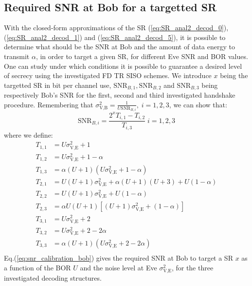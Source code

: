 \documentclass[journal,comsoc]{IEEEtran}
\begin{document}
\subsection{Required SNR at Bob for a targetted SR}
 \label{sec:required-snr-at-bob-for-a-targetted-sr}
With the closed-form approximations of the SR (\ref{eq:SR_anal2_decod_0}), (\ref{eq:SR_anal2_decod_1}) and (\ref{eq:SR_anal2_decod_5}), it is possible to determine what should be the SNR at Bob and the amount of data energy to transmit $\alpha$, in order to target a given SR, for different Eve SNR and BOR values. One can study under which conditions it is possible to guarantee a desired level of secrecy using the investigated FD TR SISO schemes. We introduce $x$ being the targetted SR in bit per channel use, $\text{SNR}_{B,1},\text{SNR}_{B,2}$ and $\text{SNR}_{B,3}$ being respectively Bob's SNR for the first, second and third investigated handshake procedure. Remembering that $\sigma^2_{\text{V,B}} = \frac{1}{U\text{SNR}_{B,i}} , \;  i = 1,2,3$, we can show that:
\begin{equation}
	\text{SNR}_{B,i} = \frac{2^x T_{i,1} - T_{i,2} }{T_{i,3}} \; i = 1,2,3
	\label{eq:snr_calibration_bob}
\end{equation}
where we define: 
\begin{equation}
\begin{split}
	T_{1,1} &=  U\sigma_{\text{V,E}}^2+1\\
	T_{1,2} &=  U\sigma_{\text{V,E}}^2+1-\alpha\\
	T_{1,3} &=  \alpha(U+1)(U\sigma_{\text{V,E}}^2+1-\alpha) \\
	T_{2,1} &=  U(U+1)\sigma_{\text{V,E}}^2 + \alpha(U+1)(U+3)+U(1-\alpha)\\
	T_{2,2} &=   U(U+1)\sigma_{\text{V,E}}^2+U(1-\alpha) \\	
	T_{2,3} &=  \alpha U(U+1)\left[(U+1)\sigma_{\text{V,E}}^2+(1-\alpha)\right] \\
	T_{3,1} &=  U\sigma_{\text{V,E}}^2+2\\
	T_{3,2} &=  U\sigma_{\text{V,E}}^2+2-2\alpha\\
	T_{3,3} &=  \alpha(U+1)(U\sigma_{\text{V,E}}^2+2-2\alpha)\\
\end{split}
\end{equation} 
Eq.(\ref{eq:snr_calibration_bob})  gives the required SNR at Bob to target a SR $x$ as a function of the BOR $U$ and the noise level at Eve $\sigma_{\text{V,E}}^2$, for the three investigated decoding structures.
\end{document}
